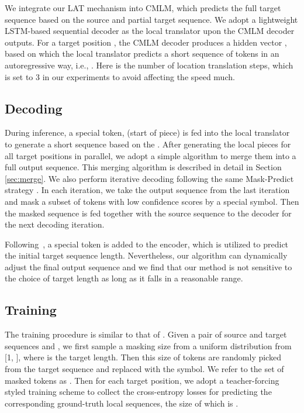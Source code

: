 \documentclass[11pt,a4paper]{article}
\begin{document}
We integrate our LAT mechanism into CMLM, which predicts the full target sequence based on the source and partial target sequence. We adopt a lightweight LSTM-based sequential decoder as the local translator upon the CMLM decoder outputs.
For a target position , the CMLM decoder produces a hidden vector , based on which the local translator predicts a short sequence of tokens in an autoregressive way, i.e., . 
Here  is the number of location translation steps, which is set to 3 in our experiments to avoid affecting the speed much.

\subsection{Decoding}
During inference, a special token,  (start of piece) is fed into the local translator to generate a short sequence based on the .
After generating the local pieces for all target positions in parallel, we adopt a simple algorithm to merge them into a full output sequence. This merging algorithm is described in detail in Section \ref{sec:merge}.
We also perform iterative decoding following the same Mask-Predict strategy \cite{ghazvininejad-etal-2019-mask,devlin2019bert}.
In each iteration, we take the output sequence from the last iteration and mask a subset of tokens with low confidence scores by a special  symbol.
Then the masked sequence is fed together with the source sequence to the decoder for the next decoding iteration.

Following~, a special token  is added to the encoder, which is utilized to predict the initial target sequence length. Nevertheless, our algorithm can dynamically adjust the final output sequence and we find that our method is not sensitive to the choice of target length as long as it falls in a reasonable range.

\subsection{Training}
The training procedure is similar to that of . Given a pair of source and target sequences  and , we first sample a masking size from a uniform distribution from [1, ], where  is the target length. Then this size of tokens are randomly picked from the target sequence and replaced with the  symbol. We refer to the set of masked tokens as .
Then for each target position, we adopt a teacher-forcing styled training scheme to collect the cross-entropy losses for predicting the corresponding ground-truth local sequences, the size of which is .
\end{document}
